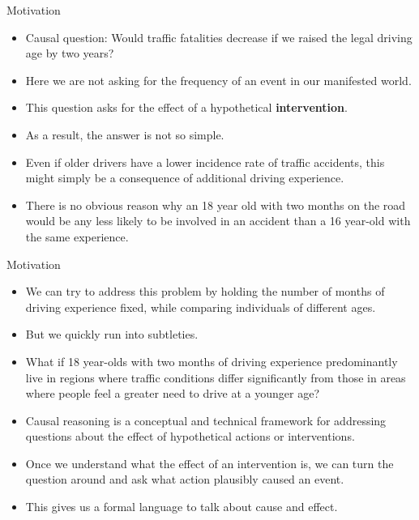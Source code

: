 \documentclass[handout]{beamer}
\begin{document}
\begin{frame}{Motivation}
\scriptsize{
\begin{itemize}
\item Causal question:  Would traffic fatalities decrease if we raised the legal driving age by two years? 
\item Here we are not asking for the frequency of an event in our manifested world.
\item This question asks for the effect of a hypothetical \textbf{intervention}.
\item As a result, the answer is not so simple. 
\item Even if older drivers have a lower incidence rate of traffic accidents, this might simply be a consequence of additional driving experience. 
\item There is no obvious reason why an 18 year old with two months on the road would be any less likely to be involved in an accident than a 16 year-old with the same experience.


\end{itemize}

} 

\end{frame}



\begin{frame}{Motivation}
\scriptsize{
\begin{itemize}
\item We can try to address this problem by holding the number of months of driving experience fixed, while comparing individuals of different ages.
\item But we quickly run into subtleties.
\item What if 18 year-olds with two months of driving experience predominantly live in regions where traffic conditions differ significantly from those in areas where people feel a greater need to drive at a younger age?

\item  Causal reasoning is a conceptual and technical framework for addressing questions about the effect of hypothetical actions or interventions. 
\item Once we understand what the effect of an intervention is, we can turn the question around and ask what action plausibly caused an event. 
\item This gives us a formal language to talk about cause and effect.


\end{itemize}

} 

\end{frame}
\end{document}

